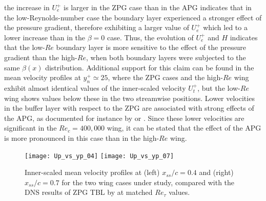 the increase in $U^{+}_{e}$ is larger in the ZPG case than in the APG indicates that in the low-Reynolds-number case the boundary layer experienced a stronger effect of the pressure gradient, therefore exhibiting a larger value of $U^{+}_{e}$ which led to a lower increase than in the $\beta=0$ case. Thus, the evolution of $U^{+}_{e}$ and $H$ indicates that the low-$Re$ boundary layer is more sensitive to the effect of the pressure gradient than the high-$Re$, when both boundary layers were subjected to the same $\beta(x)$ distribution. Additional support for this claim can be found in the mean velocity profiles at $y^{+}_{n} \simeq 25$, where the ZPG cases and the high-$Re$ wing exhibit almost identical values of the inner-scaled velocity $U^{+}_{t}$, but the low-$Re$ wing shows values below these in the two streamwise positions. Lower velocities in the buffer layer with respect to the ZPG are associated with strong effects of the APG, as documented for instance by \cite{spalart_watmuff} or \cite{bobke_et_al}. Since these lower velocities are significant in the $Re_{c}=400,000$ wing, it can be stated that the effect of the APG is more pronounced in this case than in the high-$Re$ wing.
\begin{figure}[t]
\centering
\texttt{[image: Up\_vs\_yp\_04]}
\texttt{[image: Up\_vs\_yp\_07]}
\caption{Inner-scaled mean velocity profiles at (left) $x_{ss}/c=0.4$ and (right) $x_{ss}/c=0.7$ for the two wing cases under study, compared with the DNS results of ZPG TBL by \cite{schlatter10} at matched $Re_{\tau}$ values.}
\label{Up_vs_yp}
\end{figure}

